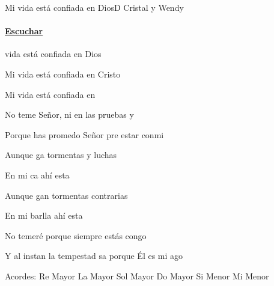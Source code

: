 \documentclass[12pt, spanish]{book}
\begin{document}
    \begin{song}{Mi vida está confiada en Dios}{D}
    {} %
    {Cristal y Wendy}
    {} %
    {} %
        \ifChordBk
            \paragraph{\mbox{}\hfill\protect\href{https://open.spotify.com/intl-es/track/5ed2jaNJA6aSmwvsAJrJgi}{Escuchar}\mbox{}\hfill}
        \fi


        \begin{SBChorus}
             vida está confiada en Dios

            Mi vida está confiada en Cristo

            Mi vida está confiada en 

            No teme Señor, ni en las pruebas y 

            Porque has promedo Señor pre estar conmi
        \end{SBChorus}

        \begin{SBOpGroup}
            Aunque ga tormentas y luchas

            En mi ca ahí esta 

            Aunque gan tormentas contrarias

            En mi barlla ahí esta 

            No temeré porque siempre estás congo

            Y al instan la tempestad sa porque Él es mi ago
        \end{SBOpGroup}

        \ifChordBk
        \begin{SBOpGroup}
            Acordes:\break
            \upchord{\D}\qquad Re Mayor \hfill
            \upchord{\A}\qquad La Mayor \hfill\null\break
            \upchord{\G}\qquad Sol Mayor \hfill
            \upchord{\C}\qquad Do Mayor \hfill\null\break
            \upchord{\Bm}\qquad Si Menor \hfill
            \upchord{\Em}Mi Menor \hfill\null\break
        \end{SBOpGroup}
        \fi
    \end{song}
\end{document}
